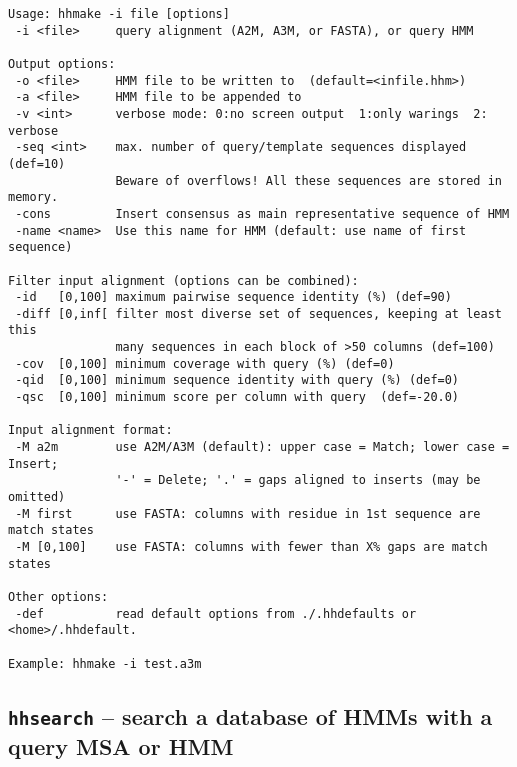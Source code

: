 \documentclass[11pt,a4paper]{article}
\begin{document}
\small \begin{verbatim}
Usage: hhmake -i file [options]                                       
 -i <file>     query alignment (A2M, A3M, or FASTA), or query HMM         

Output options:                                                           
 -o <file>     HMM file to be written to  (default=<infile.hhm>)          
 -a <file>     HMM file to be appended to                                 
 -v <int>      verbose mode: 0:no screen output  1:only warings  2: verbose
 -seq <int>    max. number of query/template sequences displayed (def=10)  
               Beware of overflows! All these sequences are stored in memory.
 -cons         Insert consensus as main representative sequence of HMM 
 -name <name>  Use this name for HMM (default: use name of first sequence)   

Filter input alignment (options can be combined):                         
 -id   [0,100] maximum pairwise sequence identity (%) (def=90)   
 -diff [0,inf[ filter most diverse set of sequences, keeping at least this    
               many sequences in each block of >50 columns (def=100)
 -cov  [0,100] minimum coverage with query (%) (def=0) 
 -qid  [0,100] minimum sequence identity with query (%) (def=0) 
 -qsc  [0,100] minimum score per column with query  (def=-20.0)

Input alignment format:                                                    
 -M a2m        use A2M/A3M (default): upper case = Match; lower case = Insert;
               '-' = Delete; '.' = gaps aligned to inserts (may be omitted)   
 -M first      use FASTA: columns with residue in 1st sequence are match states
 -M [0,100]    use FASTA: columns with fewer than X% gaps are match states   

Other options:                                                               
 -def          read default options from ./.hhdefaults or <home>/.hhdefault. 

Example: hhmake -i test.a3m 
\end{verbatim} \normalsize


\subsection{{\tt hhsearch} -- search a database of HMMs with a query MSA or HMM}
\end{document}
